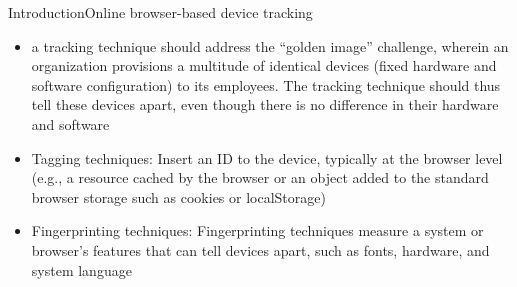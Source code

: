 \documentclass[aspectratio=169, hyperref={colorlinks=true, allcolors=SecondaryColor}, c]{beamer}
\begin{document}
\begin{frame}[fragile]{Introduction}{Online browser-based device tracking}
\begin{itemize}
			\item a tracking technique should address the \enquote{golden image} challenge, wherein an organization provisions a multitude of identical devices (fixed hardware and software configuration) to its employees. The tracking technique should thus tell these devices apart, even though there is no difference in their hardware and software
			\item \alert{Tagging techniques:} Insert an ID to the device, typically at the browser level (e.g., a resource cached by the browser or an object added to the standard browser storage such as cookies or localStorage)
			\item \alert{Fingerprinting techniques:} Fingerprinting techniques measure a system or browser’s features that can tell devices apart, such as fonts, hardware, and system language
		\end{itemize}
	\fi
\end{frame}
\end{document}
